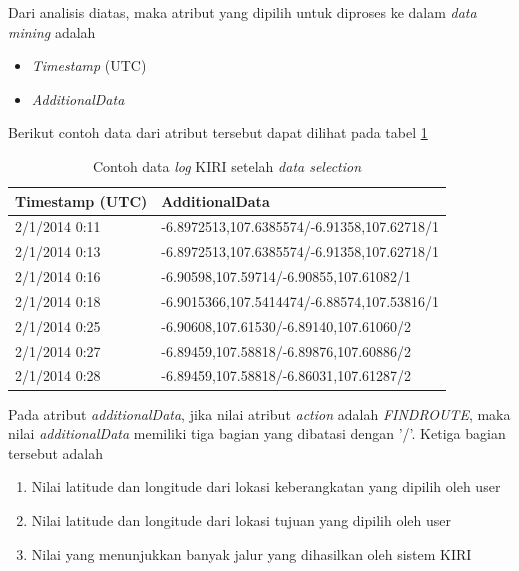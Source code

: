 Dari analisis diatas, maka atribut yang dipilih untuk diproses ke dalam \textsl{data mining} adalah
\begin{itemize}
	\item \textsl{Timestamp} (UTC)
	\item \textsl{AdditionalData}
\end{itemize}

Berikut contoh data dari atribut tersebut dapat dilihat pada tabel \ref{table:contohDataLog}
\begin{table}[h]
\centering
\caption{Contoh data \textsl{log} KIRI setelah \textsl{data selection}}
\label{table:contohDataLog}
\begin{tabular}{|l|l|}
\hline
\textbf{Timestamp (UTC)} & \textbf{AdditionalData}                     \\ \hline
2/1/2014 0:11            & -6.8972513,107.6385574/-6.91358,107.62718/1 \\ \hline
2/1/2014 0:13            & -6.8972513,107.6385574/-6.91358,107.62718/1 \\ \hline
2/1/2014 0:16            & -6.90598,107.59714/-6.90855,107.61082/1     \\ \hline
2/1/2014 0:18            & -6.9015366,107.5414474/-6.88574,107.53816/1 \\ \hline
2/1/2014 0:25            & -6.90608,107.61530/-6.89140,107.61060/2     \\ \hline
2/1/2014 0:27            & -6.89459,107.58818/-6.89876,107.60886/2     \\ \hline
2/1/2014 0:28            & -6.89459,107.58818/-6.86031,107.61287/2     \\ \hline
\end{tabular}
\end{table}

Pada atribut \textsl{additionalData}, jika nilai atribut \textsl{action} adalah \textsl{FINDROUTE}, maka nilai \textsl{additionalData} memiliki tiga bagian yang dibatasi dengan '/'. Ketiga bagian tersebut adalah

\begin{enumerate}
	\item Nilai latitude dan longitude dari lokasi keberangkatan yang dipilih oleh user
	\item Nilai latitude dan longitude dari lokasi tujuan yang dipilih oleh user
	\item Nilai yang menunjukkan banyak jalur yang dihasilkan oleh sistem KIRI
\end{enumerate}

